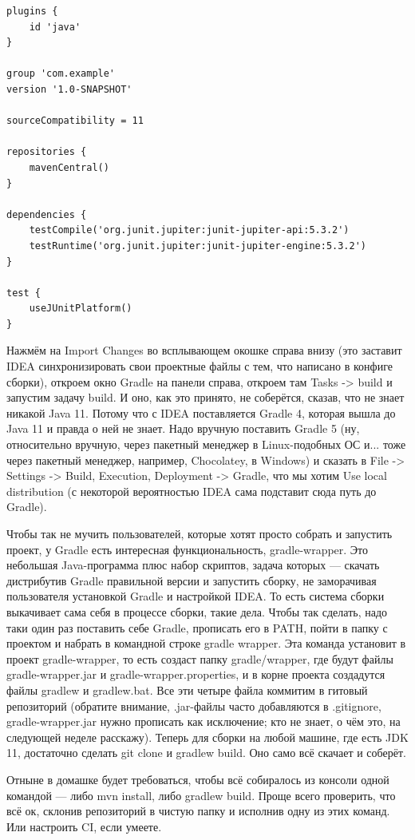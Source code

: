 \documentclass[a5paper]{article}
\begin{document}
\begin{verbatim}
plugins {
    id 'java'
}

group 'com.example'
version '1.0-SNAPSHOT'

sourceCompatibility = 11

repositories {
    mavenCentral()
}

dependencies {
    testCompile('org.junit.jupiter:junit-jupiter-api:5.3.2')
    testRuntime('org.junit.jupiter:junit-jupiter-engine:5.3.2')
}

test {
    useJUnitPlatform()
}
\end{verbatim}

Нажмём на Import Changes во всплывающем окошке справа внизу (это заставит IDEA синхронизировать свои проектные файлы с тем, что написано в конфиге сборки), откроем окно Gradle на панели справа, откроем там Tasks -> build и запустим задачу build. И оно, как это принято, не соберётся, сказав, что не знает никакой Java 11. Потому что с IDEA поставляется Gradle 4, которая вышла до Java 11 и правда о ней не знает. Надо вручную поставить Gradle 5 (ну, относительно вручную, через пакетный менеджер в Linux-подобных ОС и... тоже через пакетный менеджер, например, Chocolatey, в Windows) и сказать в File -> Settings -> Build, Execution, Deployment -> Gradle, что мы хотим Use local distribution (с некоторой вероятностью IDEA сама подставит сюда путь до Gradle).

Чтобы так не мучить пользователей, которые хотят просто собрать и запустить проект, у Gradle есть интересная функциональность, gradle-wrapper. Это небольшая Java-программа плюс набор скриптов, задача которых --- скачать дистрибутив Gradle правильной версии и запустить сборку, не заморачивая пользователя установкой Gradle и настройкой IDEA. То есть система сборки выкачивает сама себя в процессе сборки, такие дела. Чтобы так сделать, надо таки один раз поставить себе Gradle, прописать его в PATH, пойти в папку с проектом и набрать в командной строке gradle wrapper. Эта команда установит в проект gradle-wrapper, то есть создаст папку gradle/wrapper, где будут файлы gradle-wrapper.jar и gradle-wrapper.properties, и в корне проекта создадутся файлы gradlew и gradlew.bat. Все эти четыре файла коммитим в гитовый репозиторий (обратите внимание, .jar-файлы часто добавляются в .gitignore, gradle-wrapper.jar нужно прописать как исключение; кто не знает, о чём это, на следующей неделе расскажу). Теперь для сборки на любой машине, где есть JDK 11, достаточно сделать git clone и gradlew build. Оно само всё скачает и соберёт.

Отныне в домашке будет требоваться, чтобы всё собиралось из консоли одной командой --- либо mvn install, либо gradlew build. Проще всего проверить, что всё ок, склонив репозиторий в чистую папку и исполнив одну из этих команд. Или настроить CI, если умеете.
\end{document}

